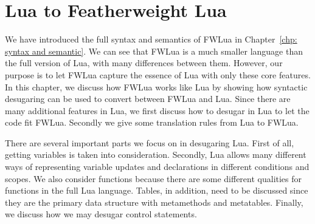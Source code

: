 \newcommand{\desugar}[2]{{#1} & \xlongequal[]{def} & {\begin{array}{@{}l@{}} #2 \end{array}}\\}
\newcommand{\definefunc}[2]{{#1} & \xlongequal[]{} & {\begin{array}{@{}l@{}} #2 \end{array}}\\}
\newcommand{\desugarline}[1]{ & & {\begin{array}{@{}l@{}} #1 \end{array}}\\}
\newcommand{\translate}[2]{\llbracket {#1} \rrbracket & \xlongequal[]{} & {\begin{array}{@{}l@{}} #2 \end{array}}\\}
\newcommand{\translateline}[1]{ & & {\begin{array}{@{}l@{}} #1 \end{array}}\\}

\chapter{Lua to Featherweight Lua}
\label{chp:luaTranslation}

We have introduced the full syntax and semantics of FWLua in Chapter~\ref{chp: syntax and semantic}. We can see that FWLua is a much smaller language than the full version of Lua, with many differences between them.
However, our purpose is to let FWLua capture the essence of Lua with only these core features.
In this chapter, we discuss how FWLua works like Lua by showing how syntactic desugaring can be used to convert between FWLua and Lua. Since there are many additional features in Lua, we first discuss how to desugar in Lua to let the code fit FWLua. Secondly we give some translation rules from Lua to FWLua.

There are several important parts we focus on in desugaring Lua. First of all, getting variables is taken into consideration. Secondly, Lua allows many different ways of representing variable updates and declarations in different conditions and scopes. We also consider functions because there are some different qualities for functions in the full Lua language. Tables, in addition, need to be discussed since they are the primary data structure with metamethods and metatables. Finally, we discuss how we may desugar control statements. 

